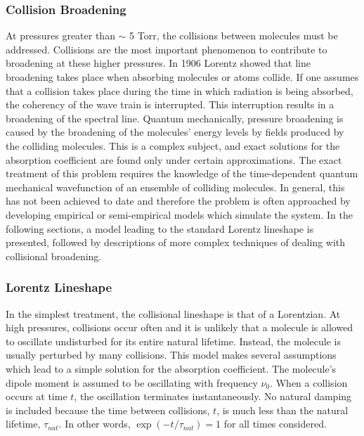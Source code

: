 \documentclass[11pt]{article}
\begin{document}
\subsubsection{Collision Broadening}\label{sec:collision}

At pressures greater than $\sim$ 5 Torr, the collisions between molecules
must be addressed.  Collisions are the most important phenomenon to
contribute to broadening at these higher pressures.  In 1906 Lorentz showed
that line broadening takes place when absorbing molecules or atoms collide.
If one assumes that a collision takes place during the time in which
radiation is being absorbed, the coherency of the wave train is
interrupted.  This interruption results in a broadening of the spectral
line.  Quantum mechanically, pressure broadening is caused by the
broadening of the molecules' energy levels by fields produced by the
colliding molecules.  This is a complex
subject, and exact solutions for the absorption coefficient are found only
under certain approximations.  The exact treatment of this problem
requires the knowledge of the time-dependent quantum mechanical
wavefunction of an ensemble of colliding molecules.  In general, this has 
not been achieved to date and therefore the problem is often approached by 
developing empirical or semi-empirical models which simulate the system.
In the following sections, a model leading to the standard Lorentz
lineshape is presented, followed by descriptions of more complex techniques
of dealing with collisional broadening.

\subsubsection{Lorentz Lineshape}\label{sec:lorentz}

In the simplest treatment, the collisional lineshape is that of a
Lorentzian.  At high pressures, collisions occur often and it is unlikely
that a molecule is allowed to oscillate undisturbed for its entire
natural lifetime.  Instead, the molecule is usually perturbed by many 
collisions.  This model makes several assumptions which lead to a simple
solution for the absorption coefficient.  The molecule's dipole moment is
assumed to be oscillating with frequency $\nu_{0}$.  When a collision
occurs at time $t$, the oscillation terminates instantaneously.  No
natural damping is included because the time between collisions,
$t$, is much less than the natural lifetime, $\tau_{nat}$.  In other
words, $\exp(-t/\tau_{nat})=1$ for all times considered.
\end{document}
